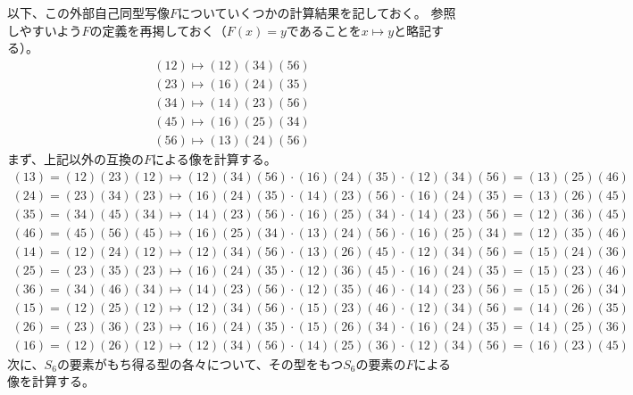 \documentclass[11pt]{jarticle}
\begin{document}
以下、この外部自己同型写像$F$についていくつかの計算結果を記しておく。
参照しやすいよう$F$の定義を再掲しておく（$F(x) = y$であることを$x \mapsto y$と略記する）。
\begin{displaymath}
\begin{split}
(12) \mapsto (12)(34)(56) \\
(23) \mapsto (16)(24)(35) \\
(34) \mapsto (14)(23)(56) \\
(45) \mapsto (16)(25)(34) \\
(56) \mapsto (13)(24)(56)
\end{split}
\end{displaymath}
まず、上記以外の互換の$F$による像を計算する。
\begin{displaymath}
\begin{split}
(13) = (12)(23)(12) \mapsto (12)(34)(56) \cdot (16)(24)(35) \cdot (12)(34)(56) = (13)(25)(46) \\
(24) = (23)(34)(23) \mapsto (16)(24)(35) \cdot (14)(23)(56) \cdot (16)(24)(35) = (13)(26)(45) \\
(35) = (34)(45)(34) \mapsto (14)(23)(56) \cdot (16)(25)(34) \cdot (14)(23)(56) = (12)(36)(45) \\
(46) = (45)(56)(45) \mapsto (16)(25)(34) \cdot (13)(24)(56) \cdot (16)(25)(34) = (12)(35)(46) \\
(14) = (12)(24)(12) \mapsto (12)(34)(56) \cdot (13)(26)(45) \cdot (12)(34)(56) = (15)(24)(36)%
\end{split}
\end{displaymath}
\begin{displaymath}
\begin{split}
(25) = (23)(35)(23) \mapsto (16)(24)(35) \cdot (12)(36)(45) \cdot (16)(24)(35) = (15)(23)(46) \\
(36) = (34)(46)(34) \mapsto (14)(23)(56) \cdot (12)(35)(46) \cdot (14)(23)(56) = (15)(26)(34) \\
(15) = (12)(25)(12) \mapsto (12)(34)(56) \cdot (15)(23)(46) \cdot (12)(34)(56) = (14)(26)(35) \\
(26) = (23)(36)(23) \mapsto (16)(24)(35) \cdot (15)(26)(34) \cdot (16)(24)(35) = (14)(25)(36) \\
(16) = (12)(26)(12) \mapsto (12)(34)(56) \cdot (14)(25)(36) \cdot (12)(34)(56) = (16)(23)(45)
\end{split}
\end{displaymath}
次に、$S_6$の要素がもち得る型の各々について、その型をもつ$S_6$の要素の$F$による像を計算する。
\end{document}

